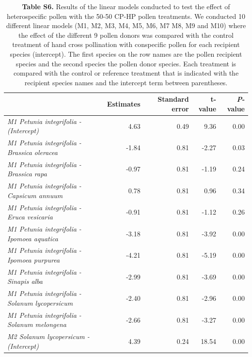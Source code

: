 \documentclass[12pt,]{article}
\begin{document}
\clearpage

\begingroup\fontsize{7}{9}\selectfont

\begin{longtable}[t]{>{\em}lrrrr}
\caption{\label{tab:unnamed-chunk-6}\textbf{Table S6.} Results of the linear models conducted to test the effect of heterospecific pollen with the 50-50 CP-HP pollen treatments. We conducted 10 different linear models (M1, M2, M3, M4, M5, M6, M7 M8, M9 and M10) where the effect of the different 9 pollen donors was compared with the control treatment of hand cross pollination with conspecific pollen for each recipient species (intercept). The first species on the row names are the pollen recipient species and the second species the pollen donor species. Each treatment is compared with the control or reference treatment that is indicated with the recipient species names and the intercept term between parentheses.}\\
\toprule
\textbf{ } & \textbf{Estimates} & \textbf{Standard error} & \textbf{t-value} & \textbf{{\textit{P}}-value}\\
\midrule
\rowcolor{gray!6}  M1 Petunia integrifolia - (Intercept) & 4.63 & 0.49 & 9.36 & 0.00\\
\addlinespace
M1 Petunia integrifolia - Brassica oleracea & -1.84 & 0.81 & -2.27 & 0.03\\
\addlinespace
\rowcolor{gray!6}  M1 Petunia integrifolia - Brassica rapa & -0.97 & 0.81 & -1.19 & 0.24\\
\addlinespace
M1 Petunia integrifolia - Capsicum annuum & 0.78 & 0.81 & 0.96 & 0.34\\
\addlinespace
\rowcolor{gray!6}  M1 Petunia integrifolia - Eruca vesicaria & -0.91 & 0.81 & -1.12 & 0.26\\
\addlinespace
M1 Petunia integrifolia - Ipomoea aquatica & -3.18 & 0.81 & -3.92 & 0.00\\
\addlinespace
\rowcolor{gray!6}  M1 Petunia integrifolia - Ipomoea purpurea & -4.21 & 0.81 & -5.19 & 0.00\\
\addlinespace
M1 Petunia integrifolia - Sinapis alba & -2.99 & 0.81 & -3.69 & 0.00\\
\addlinespace
\rowcolor{gray!6}  M1 Petunia integrifolia - Solanum lycopersicum & -2.40 & 0.81 & -2.96 & 0.00\\
\addlinespace
M1 Petunia integrifolia - Solanum melongena & -2.66 & 0.81 & -3.27 & 0.00\\
\addlinespace
\rowcolor{gray!6}  M2 Solanum lycopersicum - (Intercept) & 4.39 & 0.24 & 18.54 & 0.00\\

\end{longtable}
\end{document}

